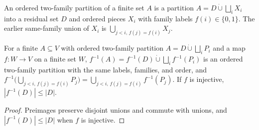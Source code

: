 \begin{definition}
    \label{def:area_law_two_family_partition}
    \leanok
    An ordered two-family partition of a finite set $A$ is a partition
    $A=D\mathbin{\dot\cup}\bigsqcup_i X_i$ into a residual set $D$ and ordered
    pieces $X_i$ with family labels $f(i)\in\{0,1\}$. The earlier same-family
    union of $X_i$ is $\bigcup_{j<i,\,f(j)=f(i)}X_j$.
\end{definition}

\begin{lemma}
    \label{thm:peps_two_family_partition_inverse_image}
    \leanok
    For a finite $A\subseteq V$ with ordered two-family partition
    $A=D\mathbin{\dot\cup}\bigsqcup_i P_i$ and a map $f:W\to V$ on a finite set
    $W$, $f^{-1}(A)=f^{-1}(D)\mathbin{\dot\cup}\bigsqcup_i f^{-1}(P_i)$ is an
    ordered two-family partition with the same labels, families, and order, and
    $f^{-1}\bigl(\bigcup_{j<i,\,f(j)=f(i)}P_j\bigr)
        =\bigcup_{j<i,\,f(j)=f(i)}f^{-1}(P_j)$. If $f$ is injective,
    $|f^{-1}(D)|\le|D|$.
\end{lemma}
\begin{proof}
    \leanok
    Preimages preserve disjoint unions and commute with unions, and
    $|f^{-1}(D)|\le|D|$ when $f$ is injective.
\end{proof}

